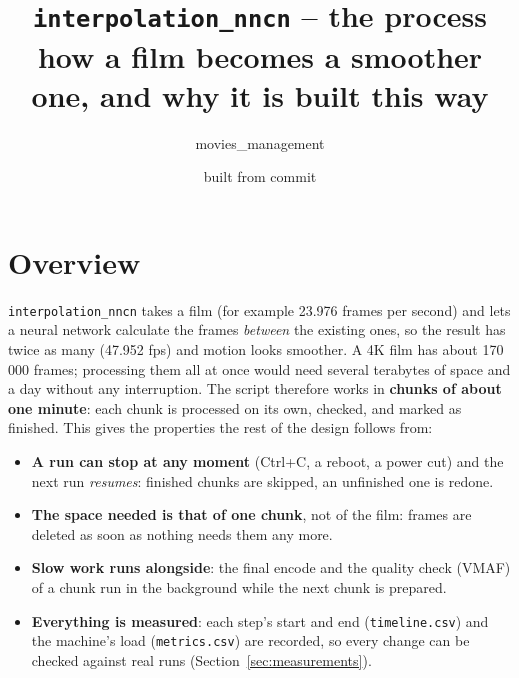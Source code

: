 \documentclass[11pt,a4paper]{article}
\title{\texttt{interpolation\_nncn} -- the process\\[0.4em]
  \large how a film becomes a smoother one, and why it is built this way}
\author{movies\_management}
\date{built from commit \documentversion}
\begin{document}
\maketitle

\noindent{}

\tableofcontents

\section{Overview}\label{sec:overview}

\texttt{interpolation\_nncn} takes a film (for example 23.976 frames per second) and lets a neural
network calculate the frames \emph{between} the existing ones, so the result has twice as many
(47.952 fps) and motion looks smoother. A 4K film has about 170\,000 frames; processing them all at
once would need several terabytes of space and a day without any interruption. The script
therefore works in \textbf{chunks of about one minute}: each chunk is processed on its own, checked,
and marked as finished. This gives the properties the rest of the design follows from:

\begin{itemize}
  \item \textbf{A run can stop at any moment} (Ctrl+C, a reboot, a power cut) and the next run
    \emph{resumes}: finished chunks are skipped, an unfinished one is redone.
  \item \textbf{The space needed is that of one chunk}, not of the film: frames are deleted as soon
    as nothing needs them any more.
  \item \textbf{Slow work runs alongside}: the final encode and the quality check (VMAF) of a chunk
    run in the background while the next chunk is prepared.
  \item \textbf{Everything is measured}: each step's start and end (\texttt{timeline.csv}) and the
    machine's load (\texttt{metrics.csv}) are recorded, so every change can be checked against real
    runs (Section~\ref{sec:measurements}).
\end{itemize}
\end{document}
